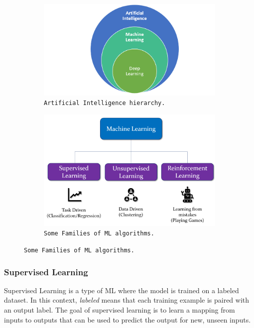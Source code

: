 \begin{figure}[ht]
    \begin{subfigure}[b]{0.45\textwidth}
        \includegraphics[width=\textwidth]{images/background/ai_ml_dl}
        \caption{\texttt{Artificial Intelligence hierarchy.}}
        \label{fig:ml_hierarchy}
    \end{subfigure}
    \hfill
    \begin{subfigure}[b]{0.45\textwidth}
        \includegraphics[width=\textwidth]{images/background/ML_Types}
        \caption{\texttt{Some Families of ML algorithms.}}
        \label{fig:ml_types}
    \end{subfigure}
    \hfill
    
\end{figure}








\subsubsection{Supervised Learning}
\label{subsubsec:supervised_ml}
Supervised Learning is a type of ML where the model is trained on a labeled dataset.
In this context, \textit{labeled} means that each training example is paired with an output label.
The goal of supervised learning is to learn a mapping from inputs to outputs that can be used to predict the output for new, unseen inputs.


